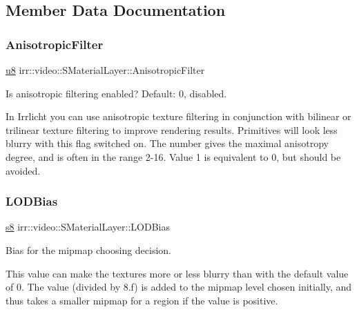 \subsection{Member Data Documentation}
\mbox{\label{classirr_1_1video_1_1SMaterialLayer_aed142b316a920ec8fc5e0df09d3de3eb}} 
\subsubsection{\texorpdfstring{Anisotropic\+Filter}{AnisotropicFilter}}
{\footnotesize\ttfamily \hyperlink{namespaceirr_a646874f69af8ff87fc10201b0254a761}{u8} irr\+::video\+::\+S\+Material\+Layer\+::\+Anisotropic\+Filter}



Is anisotropic filtering enabled? Default\+: 0, disabled. 

In Irrlicht you can use anisotropic texture filtering in conjunction with bilinear or trilinear texture filtering to improve rendering results. Primitives will look less blurry with this flag switched on. The number gives the maximal anisotropy degree, and is often in the range 2-\/16. Value 1 is equivalent to 0, but should be avoided. \mbox{\label{classirr_1_1video_1_1SMaterialLayer_a5d1ac213ab5b7bcab23464eefd102b53}} 
\subsubsection{\texorpdfstring{L\+O\+D\+Bias}{LODBias}}
{\footnotesize\ttfamily \hyperlink{namespaceirr_adc3ec66d7537550be0fea1c9eeadd63d}{s8} irr\+::video\+::\+S\+Material\+Layer\+::\+L\+O\+D\+Bias}



Bias for the mipmap choosing decision. 

This value can make the textures more or less blurry than with the default value of 0. The value (divided by 8.\+f) is added to the mipmap level chosen initially, and thus takes a smaller mipmap for a region if the value is positive. \mbox{\label{classirr_1_1video_1_1SMaterialLayer_afb8408075afd8e84c8ff7c46f7a899bb}} 
